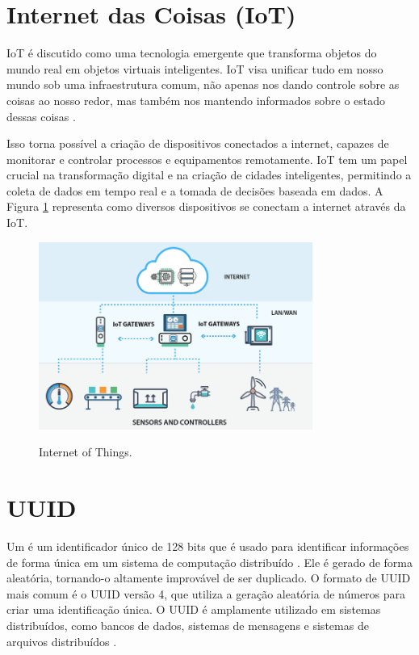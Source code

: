 \section{Internet das Coisas (IoT)}
\gls{IoT} é discutido como uma tecnologia emergente que transforma objetos do mundo real em objetos virtuais inteligentes. \gls{IoT} visa unificar tudo em nosso mundo sob uma infraestrutura comum, não apenas nos dando controle sobre as coisas ao nosso redor, mas também nos mantendo informados sobre o estado dessas coisas \cite{Madakam:2015}. 

Isso torna possível a criação de dispositivos conectados a internet, capazes de monitorar e controlar processos e equipamentos remotamente. \gls{IoT} tem um papel crucial na transformação digital e na criação de cidades inteligentes, permitindo a coleta de dados em tempo real e a tomada de decisões baseada em dados. A Figura \ref{fig:iot} representa como diversos dispositivos se conectam a internet através da IoT.

\begin{figure}[h]
\centering
\caption{Internet of Things.}
\includegraphics[width=0.8\textwidth]{figuras/iot.png}
\label{fig:iot}
\end{figure}

\section{UUID}

Um  é um identificador único de 128 bits que é usado para identificar informações de forma única em um sistema de computação distribuído \cite{Leach2005}. Ele é gerado de forma aleatória, tornando-o altamente improvável de ser duplicado. O formato de UUID mais comum é o \gls{UUID} versão 4, que utiliza a geração aleatória de números para criar uma identificação única. O UUID é amplamente utilizado em sistemas distribuídos, como bancos de dados, sistemas de mensagens e sistemas de arquivos distribuídos \cite{Leach2005}.

